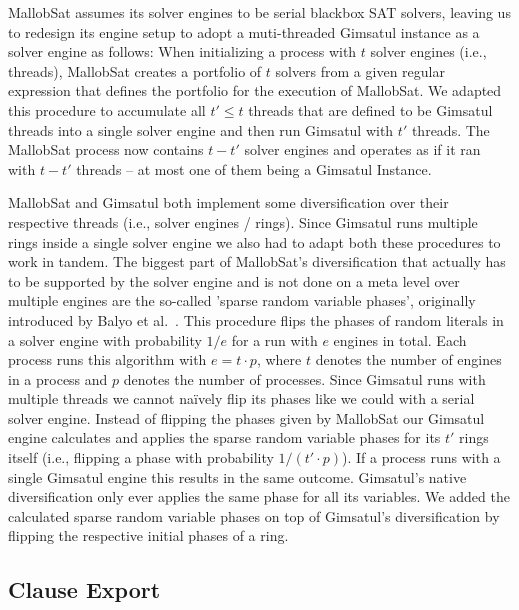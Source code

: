 \documentclass[12pt,a4paper,twoside]{scrartcl}
\numberwithin{equation}{section}
\begin{document}
MallobSat assumes its solver engines to be serial blackbox SAT solvers, leaving us to redesign its engine setup to adopt a muti-threaded Gimsatul instance as a solver engine as follows: 
When initializing a process with $t$ solver engines (i.e., threads), MallobSat creates a portfolio of $t$ solvers from a given regular expression that defines the portfolio for the execution of MallobSat. We adapted this procedure to accumulate all $t' \leq t$ threads that are defined to be Gimsatul threads into a single solver engine and then run Gimsatul with $t'$ threads. The MallobSat process now contains $t - t'$ solver engines and operates as if it ran with $t - t'$ threads -- at most one of them being a Gimsatul Instance.

MallobSat and Gimsatul both implement some diversification over their respective threads (i.e., solver engines / rings). Since Gimsatul runs multiple rings inside a single solver engine we also had to adapt both these procedures to work in tandem.
The biggest part of MallobSat's diversification that actually has to be supported by the solver engine and is not done on a meta level over multiple engines are the so-called 'sparse random variable phases', originally introduced by Balyo et al.~\cite{hordeSat}. This procedure flips the phases of random literals in a solver engine with probability $1 / e$ for a run with $e$ engines in total. Each process runs this algorithm with $e = t \cdot p$, where $t$ denotes the number of engines in a process and $p$ denotes the number of processes. Since Gimsatul runs with multiple threads we cannot na\"ively flip its phases like we could with a serial solver engine. Instead of flipping the phases given by MallobSat our Gimsatul engine calculates and applies the sparse random variable phases for its $t'$ rings itself (i.e., flipping a phase with probability $1 / (t' \cdot p)$). If a process runs with a single Gimsatul engine this results in the same outcome.
Gimsatul's native diversification only ever applies the same phase for all its variables. We added the calculated sparse random variable phases on top of Gimsatul's diversification by flipping the respective initial phases of a ring.

\subsection{Clause Export}
\end{document}
